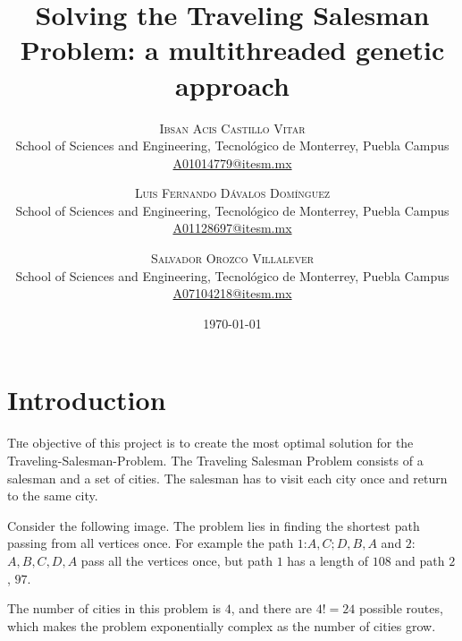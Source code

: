 \documentclass[twoside,twocolumn]{article}
\title{Solving the Traveling Salesman Problem: a multithreaded genetic approach} %
\author{%
\textsc{Ibsan Acis Castillo Vitar} \\[1ex] %
\normalsize School of Sciences and Engineering, Tecnológico de Monterrey, Puebla Campus \\ %
\normalsize \href{mailto:A01014779@itesm.mx}{A01014779@itesm.mx} %
\and %
\textsc{Luis Fernando Dávalos Domínguez} \\[1ex] %
\normalsize School of Sciences and Engineering, Tecnológico de Monterrey, Puebla Campus \\ %
\normalsize \href{mailto:A01128697@itesm.mx}{A01128697@itesm.mx} %
\and %
\textsc{Salvador Orozco Villalever} \\[1ex] %
\normalsize School of Sciences and Engineering, Tecnológico de Monterrey, Puebla Campus \\ %
\normalsize \href{mailto:A07104218@itesm.mx}{A07104218@itesm.mx} %
}
\date{\today} %
\begin{document}
\maketitle


\section{Introduction}

\lettrine[nindent=0em,lines=3]{T}he objective of this project is to create the most optimal solution for the Traveling-Salesman-Problem. The Traveling Salesman Problem consists of a salesman and a set of cities. The salesman has to visit each city once and return to the same city.

Consider the following image. The problem lies in finding the shortest path passing from all vertices once. For example the path $1$:${A,C;D,B,A}$ and $2$:${A,B,C,D,A}$ pass all the vertices once, but path $1$ has a length of $108$ and path $2$, $97$.\linebreak

    
The number of cities in this problem is $4$, and there are $4! = 24$ possible routes, which makes the problem exponentially complex as the number of cities grow.\linebreak
\end{document}
